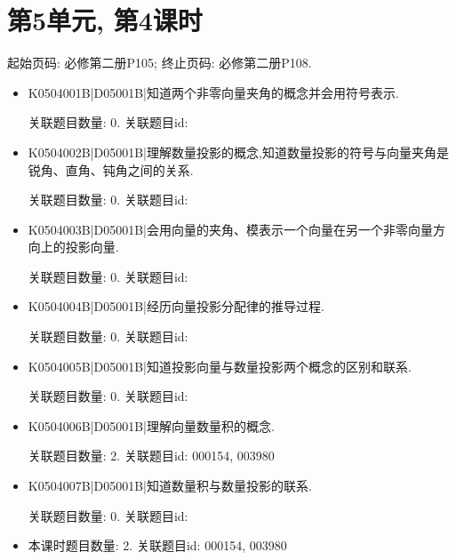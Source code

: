 \section*{第5单元, 第4课时}
起始页码: 必修第二册P105; 终止页码: 必修第二册P108.
\begin{itemize}
\item K0504001B|D05001B|知道两个非零向量夹角的概念并会用符号表示.

关联题目数量: 0. 关联题目id: 

\item K0504002B|D05001B|理解数量投影的概念,知道数量投影的符号与向量夹角是锐角、直角、钝角之间的关系.

关联题目数量: 0. 关联题目id: 

\item K0504003B|D05001B|会用向量的夹角、模表示一个向量在另一个非零向量方向上的投影向量.

关联题目数量: 0. 关联题目id: 

\item K0504004B|D05001B|经历向量投影分配律的推导过程.

关联题目数量: 0. 关联题目id: 

\item K0504005B|D05001B|知道投影向量与数量投影两个概念的区别和联系.

关联题目数量: 0. 关联题目id: 

\item K0504006B|D05001B|理解向量数量积的概念.

关联题目数量: 2. 关联题目id: 000154, 003980

\item K0504007B|D05001B|知道数量积与数量投影的联系.

关联题目数量: 0. 关联题目id: 

\item 本课时题目数量: 2. 关联题目id: 000154, 003980

\end{itemize}

